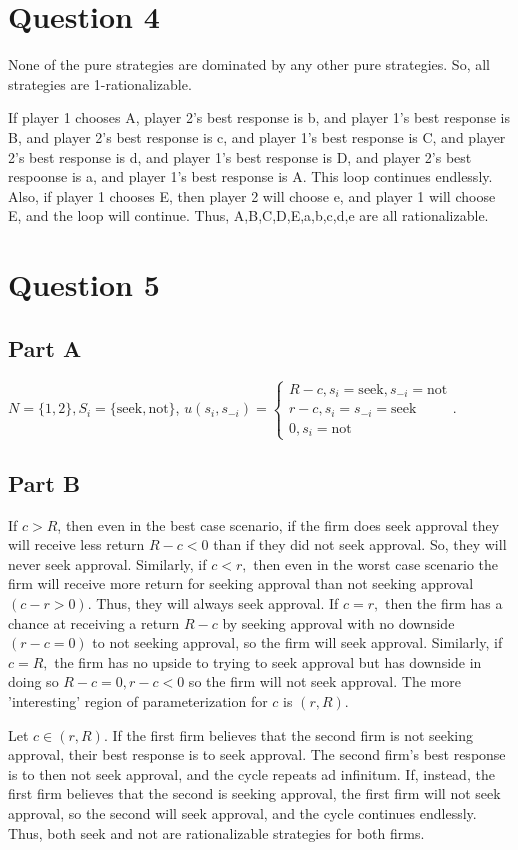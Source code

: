 \documentclass[11pt]{article} %
\begin{document}
\section{Question 4}
None of the pure strategies are dominated by any other pure strategies. So, all strategies are 1-rationalizable.

If player 1 chooses A, player 2's best response is b, and player 1's best response is B, and player 2's best response is c, and player 1's best response is C, and player 2's best response is d, and player 1's best response is D, and player 2's best respoonse is a, and player 1's best response is A. This loop continues endlessly. Also, if player 1 chooses E, then player 2 will choose e, and player 1 will choose E, and the loop will continue. Thus, A,B,C,D,E,a,b,c,d,e are all rationalizable. 

\section{Question 5}
\subsection{Part A}
$N = \{ 1,2\}, S_i = \{\text{seek},\text{not} \}$, $u(s_i,s_{-i}) = \begin{cases} R-c, s_i = \text{seek}, s_{-i} = \text{not} \\ r-c, s_i = s_{-i} = \text{seek} \\0, s_i = \text{not} \end{cases}.$
\subsection{Part B}
If $c>R$, then even in the best case scenario, if the firm does seek approval they will receive less return $R-c<0$ than if they did not seek approval. So, they will never seek approval. Similarly, if $c<r,$ then even in the worst case scenario the firm will receive more return for seeking approval than not seeking approval $(c-r>0)$. Thus, they will always seek approval. If $c=r,$ then the firm has a chance at receiving a return $R-c$ by seeking approval with no downside $(r-c=0)$ to not seeking approval, so the firm will seek approval. Similarly, if $c=R,$ the firm has no upside to trying to seek approval but has downside in doing so $R-c=0,r-c<0$ so the firm will not seek approval. The more 'interesting' region of parameterization for $c$ is $(r,R)$.

Let $c \in (r,R)$. If the first firm believes that the second firm is not seeking approval, their best response is to seek approval. The second firm's best response is to then not seek approval, and the cycle repeats ad infinitum. If, instead, the first firm believes that the second is seeking approval, the first firm will not seek approval, so the second will seek approval, and the cycle continues endlessly. Thus, both seek and not are rationalizable strategies for both firms.
\end{document}

